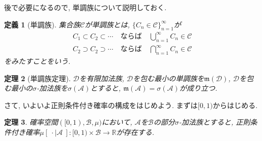 \documentclass[a4paper,12pt]{jsarticle}
\theoremstyle{break}
\newtheorem{theorem}{定理}
\newtheorem{definition}[theorem]{定義}
\begin{document}
\par 後で必要になるので, 単調族について説明しておく.
\begin{definition}[単調族]
集合族$\mathcal{C}$が単調族とは, $\{C_n\in\mathcal{C}\}_{n=1}^\infty$が
\begin{eqnarray*}
C_1\subset C_2 \subset \cdots \ &\mbox{ならば}& \ \bigcup_{n=1}^\infty C_n \in \mathcal{C} \\
C_2\supset C_2 \supset \cdots \ &\mbox{ならば}& \ \bigcap_{n=1}^\infty C_n \in \mathcal{C} 
\end{eqnarray*}
をみたすことをいう.
\end{definition}

\begin{theorem}[単調族定理]
$\mathcal{D}$を有限加法族, $\mathcal{D}$を包む最小の単調族を$\mathfrak{m}(\mathcal{D})$,
$\mathcal{D}$を包む最小の$\sigma$-加法族を$\sigma(\mathcal{A})$とすると, 
$\mathfrak{m}(\mathcal{A})=\sigma(\mathcal{A})$が成り立つ.
\end{theorem}
さて, いよいよ正則条件付き確率の構成をはじめよう. まずは$[0,1)$からはじめる.
\begin{theorem}
確率空間$([0,1),\mathcal{B},\mu)$において, 
$\mathcal{A}$を$\mathcal{B}$の部分$\sigma$-加法族とすると, 正則条件付き確率$\mu[\ \cdot\mid\mathcal{A}\ ]:[0,1)\times\mathcal{B}\to\mathbb{R}$が存在する.
\end{theorem}
\end{document}
